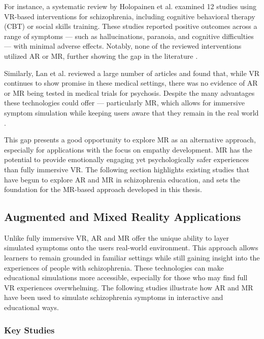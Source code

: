 \vspace{1em}

For instance, a systematic review by Holopainen et al. examined 12 studies using VR-based interventions for schizophrenia, including cognitive behavioral therapy (CBT) or social skills training. These studies reported positive outcomes across a range of symptoms — such as hallucinations, paranoia, and cognitive difficulties — with minimal adverse effects. Notably, none of the reviewed interventions utilized AR or MR, further showing the gap in the literature \cite{Holopainen2023}.

\vspace{1em}

Similarly, Lan et al. reviewed a large number of articles and found that, while VR continues to show promise in these medical settings, there was no evidence of AR or MR being tested in medical trials for psychosis. Despite the many advantages these technologies could offer — particularly MR, which allows for immersive symptom simulation while keeping users aware that they remain in the real world \cite{Lan2023}.

This gap presents a good opportunity to explore MR as an alternative approach, especially for applications with the focus on empathy development. MR has the potential to provide emotionally engaging yet psychologically safer experiences than fully immersive VR. The following section highlights existing studies that have begun to explore AR and MR in schizophrenia education, and sets the foundation for the MR-based approach developed in this thesis.

\subsection{Augmented and Mixed Reality Applications}

Unlike fully immersive VR, AR and MR offer the unique ability to layer simulated symptoms onto the users real-world environment. This approach allows learners to remain grounded in familiar settings while still gaining insight into the experiences of people with schizophrenia. These technologies can make educational simulations more accessible, especially for those who may find full VR experiences overwhelming. The following studies illustrate how AR and MR have been used to simulate schizophrenia symptoms in interactive and educational ways.

\subsubsection{Key Studies}
\label{sec:keystudies}

